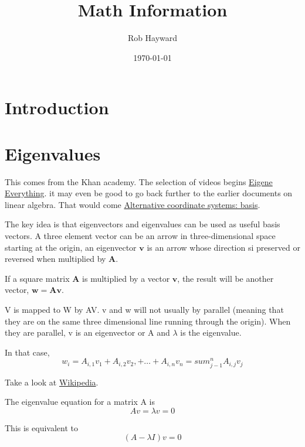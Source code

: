 \documentclass[12pt, a4paper, oneside]{article}\usepackage[]{graphicx}\usepackage[]{color}
\begin{document}
\title{Math Information}
\author{Rob Hayward}
\date{\today}
\maketitle

\section{Introduction}

\section{Eigenvalues}
This comes from the Khan academy.  The selection of videos begins \href{https://www.khanacademy.org/math/linear-algebra/alternate_bases/eigen_everything/v/linear-algebra--introduction-to-eigenvalues-and-eigenvectors}{Eigene Everything}.  it may even be good to go back further to the earlier documents on linear algebra. That would come \href{https://www.khanacademy.org/math/linear-algebra/alternate_bases}{Alternative coordinate systems:  basis}.

The key idea is that eigenvectors and eigenvalues can be used as useful basis vectors.  A three element vector can be an arrow in three-dimensional space starting at the origin, an eigenvector $\mathbf{v}$ is an arrow whose direction si preserved or reversed when multiplied by $\mathbf{A}$. 

If a square matrix $\mathbf{A}$ is multiplied by a vector $\mathbf{v}$, the result will be another vector, $\mathbf{w} = \mathbf{Av}$. 


V is mapped to W by AV.  v and w will not usually by parallel (meaning that they are on the same three dimensional line running through the origin).  When they are parallel, v is an eigenvector or A and $\lambda$ is the eigenvalue. 

In that case, 
\begin{equation}
w_i = A_{i,1} v_1 + A_{i,2} v_2, + \dots +A_{i, n}v_n = sum_{j-1}^n A_{i,j}v_j
\end{equation}

Take a look at \href{https://www.khanacademy.org/math/linear-algebra/alternate_bases}{Wikipedia}.  

The eigenvalue equation for a matrix A is 
\begin{equation}
Av =  \lambda v = 0
\end{equation}

This is equivalent to 
\begin{equation}
(A - \lambda I) v = 0
\end{equation}
\end{document}
